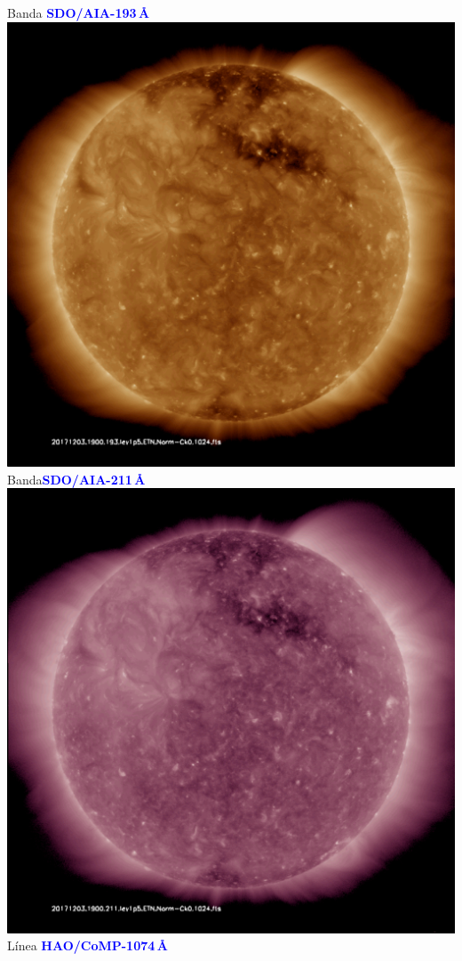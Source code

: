 \documentclass[a1,portrait,final]{baposter_old}
\def\azul#1{\textcolor{blue}{\bf\sf #1}}
\begin{document}
\begin{poster}
{{\begin{center}
Banda \azul{SDO/AIA-193\,\AA}\\
\includegraphics[width=0.9\columnwidth]{img_193.pdf}\\
Banda\azul{SDO/AIA-211\,\AA}\\
\includegraphics[width=0.9\columnwidth]{img_211.pdf}\\
Línea \azul{HAO/CoMP-1074\,\AA}\\

\end{center}}}
\end{poster}
\end{document}
